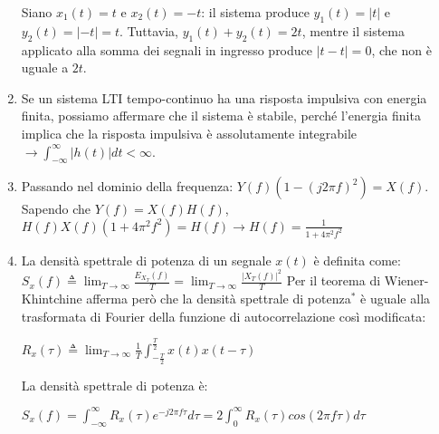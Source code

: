 \documentclass[12pt
]{article}
\begin{document}
\begin{enumerate}
	Siano 	\(x_1(t) = t\) e \(x_2(t) = -t\):  il sistema produce \(y_1(t) = |t|\)
	e \(y_2(t) = |-t| = t\). Tuttavia, \(y_1(t) + y_2(t) = 2t\), mentre il
	sistema applicato alla somma dei segnali in ingresso produce
	\(|t - t| = 0\), che non è uguale a \(2t\).
	\item
	Se un sistema LTI tempo-continuo ha una risposta impulsiva con energia
	finita, possiamo affermare che il sistema è stabile, perché l'energia 	finita implica che la risposta impulsiva è assolutamente integrabile $\to  \displaystyle \int_{-\infty}^\infty |h(t)| dt < \infty$. 
	\item
	Passando nel dominio della frequenza: \newline
	$\displaystyle Y(f)(1-(j2\pi f)^2)=X(f)$. Sapendo che $Y(f)=X(f)H(f)$, \newline
	$\displaystyle H(f)X(f)(1+4\pi^2 f^2)=H(f) \to H(f)=\frac{1}{1+4\pi^2 f^2}$
	\item
	La densità spettrale di potenza di un segnale \(x(t)\) è definita come: \newline
	$\displaystyle S_x(f) \triangleq \lim_{T \to \infty} \frac{E_{X_T}(f)}{T} = \lim_{T \to \infty} \frac{|X_T(f)|^2}{T}$ \newline
	Per il teorema di Wiener-Khintchine afferma però che la densità spettrale di potenza$^*$ è uguale alla trasformata di Fourier della funzione di autocorrelazione così modificata: \newline
	
		$\displaystyle R_x(\tau) \triangleq  \lim_{T \to \infty} \frac{1}{T} \int_{-\frac{T}{2}}^{\frac{T}{2}}x(t)x(t-\tau)$
		\newline
		
		La densità spettrale di potenza è:
		\newline
		
		 $ \displaystyle S_x(f)= \int_{-\infty}^{\infty} R_x(\tau)e^{-j2 \pi f \tau} d\tau = 2\int_{0}^{\infty}  R_x(\tau) cos(2 \pi f \tau) d\tau$ \newline
		
\end{enumerate}
\end{document}
